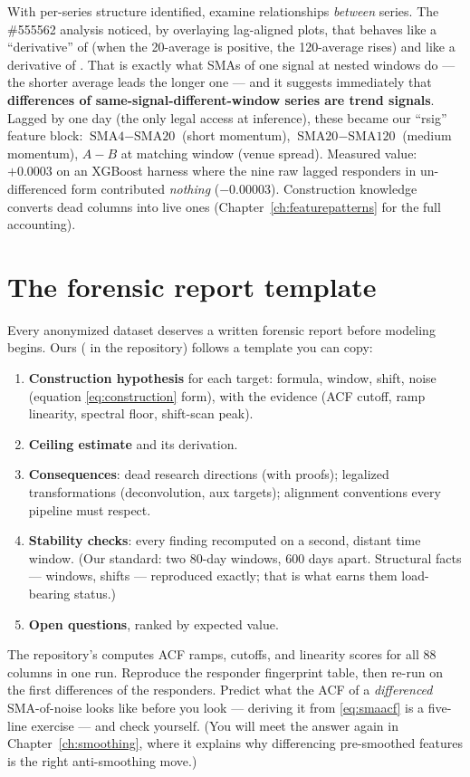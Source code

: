 With per-series structure identified, examine relationships \emph{between}
series. The \#555562 analysis noticed, by overlaying lag-aligned plots, that
 behaves like a ``derivative'' of  (when the 20-average is
positive, the 120-average rises) and  like a derivative of .
That is exactly what SMAs of one signal at nested windows do --- the shorter
average leads the longer one --- and it suggests immediately that
\textbf{differences of same-signal-different-window series are trend
signals}. Lagged by one day (the only legal access at inference), these
became our ``rsig'' feature block: $\text{SMA4}-\text{SMA20}$ (short
momentum), $\text{SMA20}-\text{SMA120}$ (medium momentum), $A{-}B$ at
matching window (venue spread). Measured value: $+0.0003$ on an XGBoost
harness where the nine raw lagged responders in un-differenced form
contributed \emph{nothing} ($-0.00003$). Construction knowledge converts
dead columns into live ones (Chapter~\ref{ch:featurepatterns} for the full
accounting).

\section{The forensic report template}

Every anonymized dataset deserves a written forensic report before modeling
begins. Ours ( in the repository) follows a
template you can copy:

\begin{enumerate}
\item \textbf{Construction hypothesis} for each target: formula, window,
  shift, noise (equation \eqref{eq:construction} form), with the evidence
  (ACF cutoff, ramp linearity, spectral floor, shift-scan peak).
\item \textbf{Ceiling estimate} and its derivation.
\item \textbf{Consequences}: dead research directions (with proofs);
  legalized transformations (deconvolution, aux targets); alignment
  conventions every pipeline must respect.
\item \textbf{Stability checks}: every finding recomputed on a second,
  distant time window. (Our standard: two 80-day windows, 600 days
  apart. Structural facts --- windows, shifts --- reproduced exactly;
  that is what earns them load-bearing status.)
\item \textbf{Open questions}, ranked by expected value.
\end{enumerate}

\begin{drillbox}
The repository's  computes ACF ramps,
cutoffs, and linearity scores for all 88 columns in one run. Reproduce the
responder fingerprint table, then re-run on the first differences of the
responders. Predict what the ACF of a \emph{differenced} SMA-of-noise looks
like before you look --- deriving it from \eqref{eq:smaacf} is a five-line
exercise --- and check yourself. (You will meet the answer again in
Chapter~\ref{ch:smoothing}, where it explains why differencing pre-smoothed
features is the right anti-smoothing move.)
\end{drillbox}

